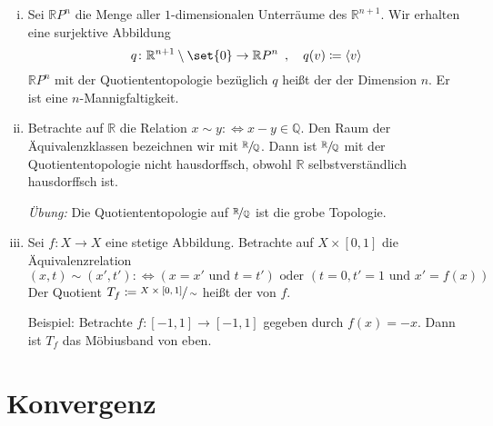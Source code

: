 \begin{beispiel}[{name=[Räume konstruiert als Quotienten]}]
\begin{enumerate}[(i)]
\begin{figure}[hbt]
			\caption[Möbius-Band]{Möbius-Band, }\label{fig:moebius}
		\end{figure}
		\item Sei $\mathbb{R}P^n$ die Menge aller $1$-dimensionalen Unterräume des $\mathbb{R}^{n+1}$. 
		Wir erhalten eine surjektive Abbildung 
		\[
			q \colon \mathbb{R}^{n+1}\setminus \set{0} \to \mathbb{R}P^n \enspace,  \quad  q(v) \coloneqq \langle v\rangle
		\]
		$\mathbb{R}P^n$ mit der Quotiententopologie bezüglich $q$ heißt der  der Dimension $n$. Er ist eine $n$-Mannigfaltigkeit.
		\item Betrachte auf $\mathbb{R}$ die Relation $x \sim y :\Leftrightarrow x-y \in \mathbb{Q}$. 
		Den Raum der Äquivalenzklassen bezeichnen wir mit $\sfrac{\mathbb{R}}{\mathbb{Q}}$. 
		Dann ist $\sfrac{\mathbb{R}}{\mathbb{Q}}$ mit der Quotiententopologie nicht hausdorffsch, obwohl $\mathbb{R}$ selbstverständlich hausdorffsch ist.
		
		\emph{Übung:} Die Quotiententopologie auf $\nicefrac{\mathbb{R}}{\mathbb{Q}}$ ist die grobe Topologie.
		\item\label{210:enum:5} Sei $f \colon X \to X$ eine stetige Abbildung. 
		Betrachte auf $X \times [0,1]$ die Äquivalenzrelation 
		\[
			(x,t) \sim (x',t') : \Longleftrightarrow (x=x' \text{ und } t=t') \text{ oder } (t=0, t'=1 \text{ und } x'= f(x))
		\] 
		Der Quotient $T_f \coloneqq \sfrac{X \times [0,1]}{\sim}$ heißt der  von $f$. 
	
		Beispiel: Betrachte $f \colon [{-1,1}] \to [{-1,1}]$ gegeben durch $f(x)=-x$. 
		Dann ist $T_f$ das Möbiusband von eben.
	\end{enumerate}
\end{beispiel}

\newpage

\section{Konvergenz} %
\label{sec:konvergenz}

